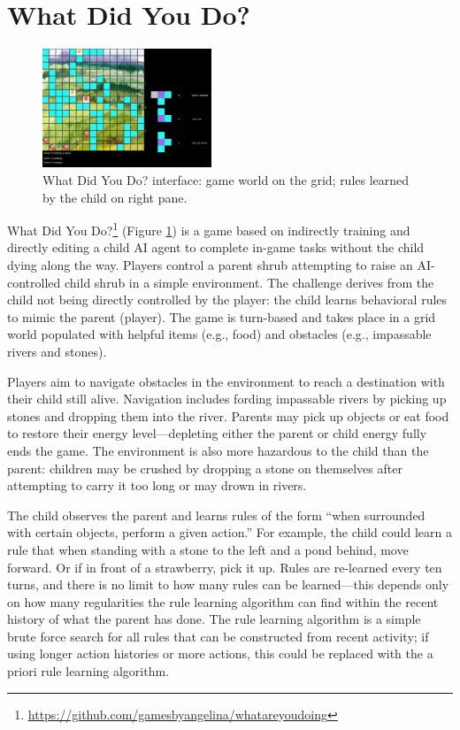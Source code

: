 \documentclass{sig-alternate}
\begin{document}
\section{What Did You Do?}
\begin{figure}[tb]
\centering
\includegraphics[width=0.45\textwidth]{images/WDYD}
\caption{{\sc What Did You Do?} interface: game world on the grid; rules learned by the child on right pane.}
\label{fig:WDYD}
\end{figure}

{\sc What Did You Do?}\footnote{\url{https://github.com/gamesbyangelina/whatareyoudoing}} (Figure \ref{fig:WDYD}) is a game based on indirectly training and directly editing a child AI agent to complete in-game tasks without the child dying along the way.
Players control a parent shrub attempting to raise an AI-controlled child shrub in a simple environment.
The challenge derives from the child not being directly controlled by the player: the child learns behavioral rules to mimic the parent (player).
The game is turn-based and takes place in a grid world populated with helpful items (e.g., food) and obstacles (e.g., impassable rivers and stones).

Players aim to navigate obstacles in the environment to reach a destination with their child still alive.
Navigation includes fording impassable rivers by picking up stones and dropping them into the river.
Parents may pick up objects or eat food to restore their energy level---depleting either the parent or child energy fully ends the game.
The environment is also more hazardous to the child than the parent: children may be crushed by dropping a stone on themselves after attempting to carry it too long or may drown in rivers.

The child observes the parent and learns rules of the form ``when surrounded with certain objects, perform a given action.''
For example, the child could learn a rule that when standing with a stone to the left and a pond behind, move forward.
Or if in front of a strawberry, pick it up.
Rules are re-learned every ten turns, and there is no limit to how many rules can be learned---this depends only on how many regularities the rule learning algorithm can find within the recent history of what the parent has done.
The rule learning algorithm is a simple brute force search for all rules that can be constructed from recent activity; if using longer action histories or more actions, this could be replaced with the a priori rule learning algorithm.
\end{document}
